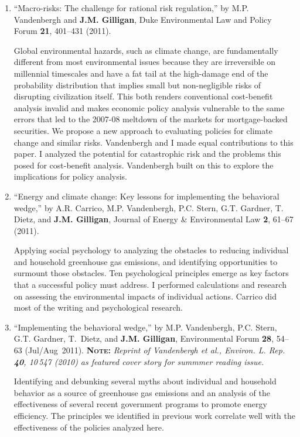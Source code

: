 \begin{enumerate}
%
	\item
	\enquote{Macro-risks: The challenge for rational risk regulation,}  by M.P.
	  Vandenbergh and \textbf{J.M. Gilligan}, Duke Environmental Law and Policy Forum
	  \textbf{21}, 401--431 (2011). 
	  \begin{credit}
	  Global environmental hazards, such as climate change, are fundamentally different from most environmental issues because they are irreversible on millennial timescales and have a fat tail at the high-damage end of the probability distribution that implies small but non-negligible risks of disrupting civilization itself. This both renders conventional cost-benefit analysis invalid and makes economic policy analysis vulnerable to the same errors that led to the 2007-08 meltdown of the markets for mortgage-backed securities. We propose a new approach to evaluating policies for climate change and similar risks.
	  Vandenbergh and I made equal contributions to this paper. I analyzed the potential for catastrophic risk and the problems this posed for cost-benefit analysis. Vandenbergh built on this to explore the implications for policy analysis.
	  \end{credit}
%	
	\item
	\enquote{Energy and climate change: Key lessons for implementing the behavioral
	  wedge,}  by A.R. Carrico, M.P. Vandenbergh, P.C. Stern, G.T. Gardner,
	  T. Dietz, and \textbf{J.M. Gilligan}, Journal of Energy \& Environmental Law
	  \textbf{2}, 61--67 (2011). 
	  \begin{credit}
	  Applying social psychology to analyzing the obstacles to reducing individual and household greenhouse gas emissions, and identifying opportunities to surmount those obstacles. Ten psychological principles emerge as key factors that a successful policy must address.
	  I performed calculations and research on assessing the environmental impacts of individual actions. Carrico did most of the writing and psychological research. 
	  \end{credit}
%	
\iffalse
	\item
	\enquote{Implementing the behavioral wedge,}  by M.P. Vandenbergh, P.C.
	  Stern, G.T. Gardner, T.~Dietz, and \textbf{J.M. Gilligan}, Environmental Forum
	  \textbf{28}, 54--63 (Jul/Aug~2011). \textbf{\scshape Note:} \emph{Reprint of
	  Vandenbergh et al., Environ. L. Rep. \textbf{40}, 10\,547 (2010) as featured
	  cover story for summmer reading issue.}  
	  \begin{credit}
	  Identifying and debunking several myths about individual and household behavior as a source of greenhouse gas emissions and an analysis of the effectiveness of several recent government programs to promote energy efficiency. The principles we identified in previous work correlate well with the effectiveness of the policies analyzed here.

\end{credit}
\end{enumerate}
